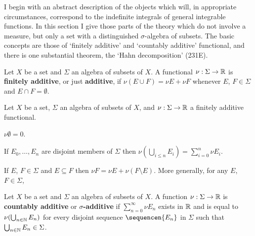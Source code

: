       
\def\chaptername{The Radon-Nikod\'ym theorem} 
\def\sectionname{Countably additive functionals} 
      
      
I begin with an abstract description of the objects which will, in 
appropriate circumstances, correspond to the indefinite integrals of 
general integrable functions.   In this section I give those parts of 
the theory which do not involve a measure, but only a set with a 
distinguished $\sigma$-algebra of subsets.   The basic concepts are 
those of `finitely additive' and `countably additive' functional, and 
there is one substantial theorem, the `Hahn decomposition' (231E). 
      
 Let $X$ be a set and $\Sigma$ an algebra of 
subsets of $X$.   A functional $\nu:\Sigma\to\Bbb R$ is 
{\bf finitely additive}, or just {\bf additive}, 
if $\nu(E\cup F)=\nu E+\nu F$ whenever $E$, 
$F\in\Sigma$ and $E\cap F=\emptyset$. 
      
 Let $X$ be a set, $\Sigma$ an algebra of 
subsets of $X$, and $\nu:\Sigma\to\Bbb R$ a finitely additive 
functional. 
      
 $\nu\emptyset=0$.    
      
 If $E_0,\ldots,E_n$ are disjoint members of 
$\Sigma$ then $\nu(\bigcup_{i\le n}E_i)=\sum_{i=0}^n\nu E_i$. 
      
 If $E$, $F\in\Sigma$ and $E\subseteq F$ then 
$\nu F=\nu E + \nu(F\setminus E)$.   More generally, for any $E$, 
$F\in\Sigma$, 
      


      
 Let $X$ be a set and $\Sigma$ an algebra of 
subsets of $X$.   A function 
$\nu:\Sigma\to\Bbb R$ is {\bf countably additive} or 
{\bf $\sigma$-additive} if $\sum_{n=0}^{\infty}\nu E_n$ exists in $\Bbb 
R$ and is equal to $\nu(\bigcup_{n\in\Bbb N}E_n)$ for every 
disjoint sequence $\sequencen{E_n}$ in $\Sigma$ such that 
$\bigcup_{n\in\Bbb N}E_n\in\Sigma$. 
      
